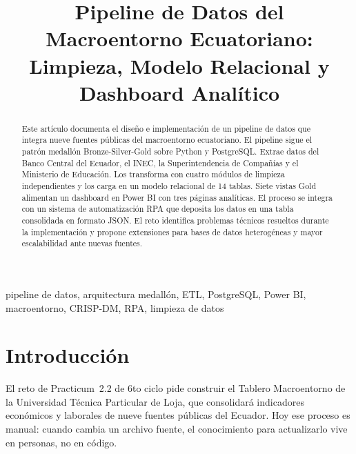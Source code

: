 \documentclass[10pt,twocolumn,spanish]{IEEEtran}
\begin{document}
\title{Pipeline de Datos del Macroentorno Ecuatoriano:\\
Limpieza, Modelo Relacional y Dashboard Analítico}

\author{
}

\maketitle

\begin{abstract}
Este artículo documenta el diseño e implementación de un pipeline de
datos que integra nueve fuentes públicas del macroentorno ecuatoriano.
El pipeline sigue el patrón medallón Bronze-Silver-Gold sobre Python y
PostgreSQL. Extrae datos del Banco Central del Ecuador, el INEC, la
Superintendencia de Compañías y el Ministerio de Educación. Los
transforma con cuatro módulos de limpieza independientes y los carga
en un modelo relacional de 14 tablas. Siete vistas Gold alimentan un
dashboard en Power BI con tres páginas analíticas. El proceso se
integra con un sistema de automatización RPA que deposita los datos
en una tabla consolidada en formato JSON. El reto identifica
problemas técnicos resueltos durante la implementación y propone
extensiones para bases de datos heterogéneas y mayor escalabilidad
ante nuevas fuentes.
\end{abstract}

\begin{IEEEkeywords}
pipeline de datos, arquitectura medallón, ETL, PostgreSQL, Power BI,
macroentorno, CRISP-DM, RPA, limpieza de datos
\end{IEEEkeywords}

\section{Introducción}

El reto de Practicum~2.2 de 6to ciclo pide construir el Tablero
Macroentorno de la Universidad Técnica Particular de Loja, que
consolidará indicadores económicos y laborales de nueve fuentes
públicas del Ecuador. Hoy ese proceso es manual: cuando cambia un
archivo fuente, el conocimiento para actualizarlo vive en personas,
no en código.
\end{document}
